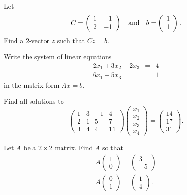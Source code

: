 \documentclass{ximera}
\begin{document}
\begin{exercise} \label{c4.1.3}
Let
\[
C = \left(\begin{array}{rr} 1 & 1\\ 2 &-1\end{array}\right) \quad\mbox{and}\quad b = \left(\begin{array}{r} 1 \\ 1\end{array}\right).
\]
Find a $2$-vector $z$ such that $Cz=b$.
\end{exercise}

\begin{exercise} \label{c4.1.4}
Write the system of linear equations
\begin{eqnarray*}
2x_1 + 3x_2 - 2x_3 & = & 4\\
6x_1 -5x_3 & = & 1
\end{eqnarray*}
in the matrix form $Ax=b$.
\end{exercise}


\begin{exercise} \label{c4.1.6}
Find all solutions to
\[
\left(\begin{array}{rrrr} 1 & 3 & -1 & 4 \\ 2 & 1 & 5 & 7 \\
3 & 4 & 4 & 11 \end{array} \right)
\left(\begin{array}{c} x_1 \\ x_2 \\ x_3 \\ x_4\end{array}\right) =
\left(\begin{array}{c} 14 \\ 17 \\31 \end{array}\right).
\]
\end{exercise}

\begin{exercise} \label{c4.1.7}
Let $A$ be a $2\times 2$ matrix.  Find $A$ so that
\begin{eqnarray*}
A\left(\begin{array}{c} 1 \\ 0 \end{array}\right) =
\left(\begin{array}{r} 3 \\ -5 \end{array}\right) \\
A\left(\begin{array}{c} 0 \\ 1 \end{array}\right) =
\left(\begin{array}{r} 1 \\ 4 \end{array}\right).
\end{eqnarray*}
\end{exercise}
\end{document}
